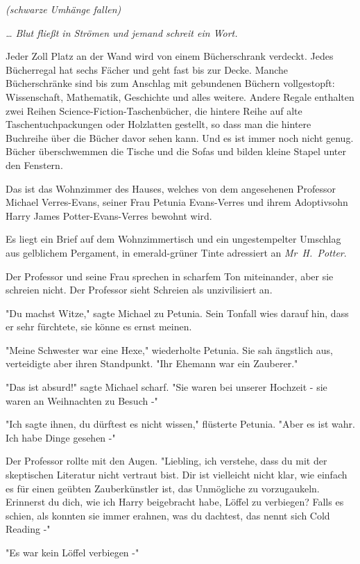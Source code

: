 {\emph{(schwarze Umhänge fallen)}

\emph{… Blut fließt in Strömen und jemand schreit ein Wort.}

\later

Jeder Zoll Platz an der Wand wird von einem Bücherschrank verdeckt. Jedes Bücherregal hat sechs Fächer und geht fast bis zur Decke. Manche Bücherschränke sind bis zum Anschlag mit gebundenen Büchern vollgestopft: Wissenschaft, Mathematik, Geschichte und alles weitere. Andere Regale enthalten zwei Reihen Science-Fiction-Taschenbücher, die hintere Reihe auf alte Taschentuchpackungen oder Holzlatten gestellt, so dass man die hintere Buchreihe über die Bücher davor sehen kann. Und es ist immer noch nicht genug. Bücher überschwemmen die Tische und die Sofas und bilden kleine Stapel unter den Fenstern.

Das ist das Wohnzimmer des Hauses, welches von dem angesehenen Professor Michael Verres-Evans, seiner Frau Petunia Evans-Verres und ihrem Adoptivsohn Harry James Potter-Evans-Verres bewohnt wird.

Es liegt ein Brief auf dem Wohnzimmertisch und ein ungestempelter Umschlag aus gelblichem Pergament, in emerald-grüner Tinte adressiert an \emph{Mr~H.~Potter}.

Der Professor und seine Frau sprechen in scharfem Ton miteinander, aber sie schreien nicht. Der Professor sieht Schreien als unzivilisiert an.

"Du machst Witze," sagte Michael zu Petunia. Sein Tonfall wies darauf hin, dass er sehr fürchtete, sie könne es ernst meinen.

"Meine Schwester war eine Hexe," wiederholte Petunia. Sie sah ängstlich aus, verteidigte aber ihren Standpunkt. "Ihr Ehemann war ein Zauberer."

"Das ist absurd!" sagte Michael scharf. "Sie waren bei unserer Hochzeit - sie waren an Weihnachten zu Besuch -"

"Ich sagte ihnen, du dürftest es nicht wissen," flüsterte Petunia. "Aber es ist wahr. Ich habe Dinge gesehen -"

Der Professor rollte mit den Augen. "Liebling, ich verstehe, dass du mit der skeptischen Literatur nicht vertraut bist. Dir ist vielleicht nicht klar, wie einfach es für einen geübten Zauberkünstler ist, das Unmögliche zu vorzugaukeln. Erinnerst du dich, wie ich Harry beigebracht habe, Löffel zu verbiegen? Falls es schien, als konnten sie immer erahnen, was du dachtest, das nennt sich Cold Reading -"

"Es war kein Löffel verbiegen -"

}
